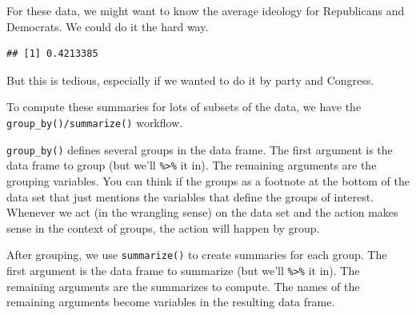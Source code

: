 \documentclass[]{book}
\newenvironment{Shaded}{\begin{snugshade}}{\end{snugshade}}
\newcommand{\CommentTok}[1]{\textcolor[rgb]{0.56,0.35,0.01}{\textit{#1}}}
\newcommand{\DataTypeTok}[1]{\textcolor[rgb]{0.13,0.29,0.53}{#1}}
\newcommand{\KeywordTok}[1]{\textcolor[rgb]{0.13,0.29,0.53}{\textbf{#1}}}
\newcommand{\NormalTok}[1]{#1}
\newcommand{\OperatorTok}[1]{\textcolor[rgb]{0.81,0.36,0.00}{\textbf{#1}}}
\newcommand{\OtherTok}[1]{\textcolor[rgb]{0.56,0.35,0.01}{#1}}
\newcommand{\StringTok}[1]{\textcolor[rgb]{0.31,0.60,0.02}{#1}}
\begin{document}
For these data, we might want to know the average ideology for Republicans and Democrats. We could do it the hard way.

\begin{Shaded}
\end{Shaded}

\begin{verbatim}
## [1] 0.4213385
\end{verbatim}

But this is tedious, especially if we wanted to do it by party and Congress.

To compute these summaries for lots of subsets of the data, we have the \texttt{group\_by()/summarize()} workflow.

\texttt{group\_by()} defines several groups in the data frame. The first argument is the data frame to group (but we'll \texttt{\%\textgreater{}\%} it in). The remaining arguments are the grouping variables. You can think if the groups as a footnote at the bottom of the data set that just mentions the variables that define the groups of interest. Whenever we act (in the wrangling sense) on the data set and the action makes sense in the context of groups, the action will happen by group.

After grouping, we use \texttt{summarize()} to create summaries for each group. The first argument is the data frame to summarize (but we'll \texttt{\%\textgreater{}\%} it in). The remaining arguments are the summarizes to compute. The names of the remaining arguments become variables in the resulting data frame.
\end{document}
